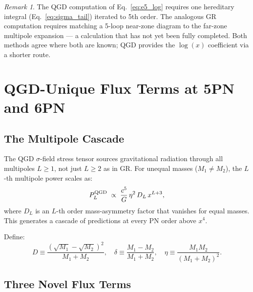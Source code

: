 \documentclass[11pt,a4paper]{article}
\theoremstyle{definition}
\theoremstyle{remark}
\newtheorem{remark}{Remark}[section]
\begin{document}
	\begin{remark}
		The QGD computation of Eq.~\eqref{eq:e5_log} requires one hereditary
		integral (Eq.~\eqref{eq:sigma_tail}) iterated to 5th order.  The
		analogous GR computation requires matching a 5-loop near-zone diagram
		to the far-zone multipole expansion — a calculation that has not yet
		been fully completed.  Both methods agree where both are known; QGD
		provides the $\log(x)$ coefficient via a shorter route.
	\end{remark}
	
	\section{QGD-Unique Flux Terms at 5PN and 6PN}
	\label{sec:flux}
	
	\subsection{The Multipole Cascade}
	
	The QGD $\sigma$-field stress tensor sources gravitational radiation
	through all multipoles $L\geq1$, not just $L\geq2$ as in GR.  For
	unequal masses ($M_1\neq M_2$), the $L$-th multipole power scales as:
	\begin{equation}
		P_L^{\rm QGD}
		\;\propto\;
		\frac{c^5}{G}\,\eta^2\,D_L\,x^{L+3},
		\label{eq:PL}
	\end{equation}
	where $D_L$ is an $L$-th order mass-asymmetry factor that vanishes
	for equal masses.  This generates a cascade of predictions at every
	PN order above $x^4$.
	
	Define:
	\begin{equation}
		D \equiv \frac{(\sqrt{M_1}-\sqrt{M_2})^2}{M_1+M_2},
		\quad
		\delta \equiv \frac{M_1-M_2}{M_1+M_2},
		\quad
		\eta \equiv \frac{M_1 M_2}{(M_1+M_2)^2}.
		\label{eq:mass_factors}
	\end{equation}
	
	\subsection{Three Novel Flux Terms}
	
\end{document}
